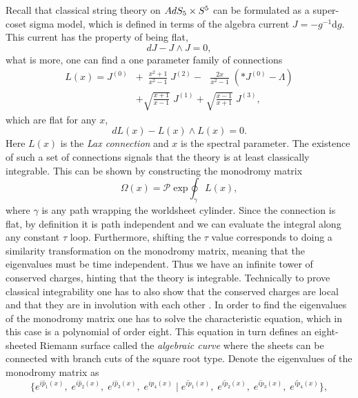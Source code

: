 Recall that classical string theory on $AdS_5 \times S^5$ can be formulated as a super-coset sigma model, which is defined in terms of the algebra current $J = -g^{-1} \mathrm{d} g$. 
This current has the property of being flat,
\begin{equation}
	dJ - J \wedge J = 0,
\end{equation}
what is more, one can find a one parameter family of connections \cite{Bena:2003wd}
\begin{equation}
\begin{split}
	\label{eq:lax_monodromy}
	L(x) = J^{(0)} & + \,\,\, \frac{x^2 + 1}{x^2 - 1} \; J^{(2)}  - \,\,\,\, \frac{2x}{x^2 - 1} \; \left( * J^{(0)} - \Lambda \right) \\ 
	 & + \sqrt{\frac{x+1}{x-1}} \; J^{(1)} + \sqrt{\frac{x-1}{x+1}} \; J^{(3)},
\end{split}
\end{equation} 
which are flat for any $x$,
\begin{equation}
	dL(x) - L(x) \wedge L(x) = 0.
\end{equation}
Here $L(x)$ is the \emph{Lax connection} and $x$ is the spectral parameter. 
The existence of such a set of connections signals that the theory is at least classically integrable. 
This can be shown by constructing the monodromy matrix
\begin{equation}
	\label{eq:monodromy}
	\Omega(x) = \mathcal{P} \; \mathrm{exp} \oint_\gamma L(x),
\end{equation}
where $\gamma$ is any path wrapping the worldsheet cylinder. 
Since the connection is flat, by definition it is path independent and we can evaluate the integral along any constant $\tau$ loop. 
Furthermore, shifting the $\tau$ value corresponds to doing a similarity transformation on the monodromy matrix, meaning that the eigenvalues must be time independent. 
Thus we have an infinite tower of conserved charges, hinting that the theory is integrable. 
Technically to prove classical integrability one has to also show that the conserved charges are local and that they are in involution with each other \cite{Das:2004hy,Berkovits:2004jw}.
In order to find the eigenvalues of the monodromy matrix one has to solve the characteristic equation, which in this case is a polynomial of order eight.
This equation in turn defines an eight-sheeted Riemann surface called the \emph{algebraic curve} where the sheets can be connected with branch cuts of the square root type. 
Denote the eigenvalues of the monodromy matrix as
\begin{equation}
	\{ e^{i\hat{p}_1(x)}, \; e^{i\hat{p}_2(x)}, \; e^{i\hat{p}_3(x)}, \; e^{i\hat{p}_4(x)} \; | \; e^{i\tilde{p}_1(x)}, \; e^{i\tilde{p}_2(x)}, \; e^{i\tilde{p}_3(x)}, \; e^{i\tilde{p}_4(x)} \},
\end{equation} 
